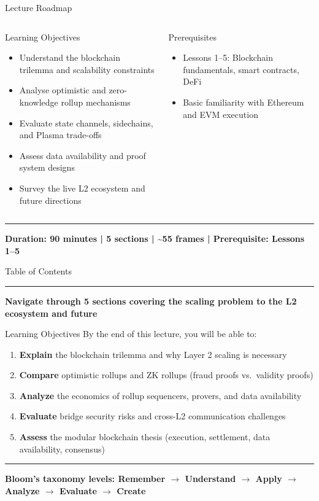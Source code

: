 \documentclass[8pt,aspectratio=169]{beamer}
\newcommand{\bottomnote}[1]{\vfill\vspace{-2mm}\textcolor{mllavender2}{\rule{\textwidth}{0.4pt}}\vspace{1mm}\footnotesize\textbf{#1}}
\begin{document}
\begin{frame}{Lecture Roadmap}
\begin{columns}[T]
\begin{block}{Learning Objectives}
\footnotesize
\begin{itemize}
  \item Understand the blockchain trilemma and scalability constraints
  \item Analyse optimistic and zero-knowledge rollup mechanisms
  \item Evaluate state channels, sidechains, and Plasma trade-offs
  \item Assess data availability and proof system designs
  \item Survey the live L2 ecosystem and future directions
\end{itemize}
\end{block}
\vspace{1mm}
\begin{block}{Prerequisites}
\footnotesize
\begin{itemize}
  \item Lessons 1--5: Blockchain fundamentals, smart contracts, DeFi
  \item Basic familiarity with Ethereum and EVM execution
\end{itemize}
\end{block}
\end{columns}
\bottomnote{Duration: 90 minutes | 5 sections | \textasciitilde55 frames | Prerequisite: Lessons 1--5}
\end{frame}

\begin{frame}{Table of Contents}
\tableofcontents
\bottomnote{Navigate through 5 sections covering the scaling problem to the L2 ecosystem and future}
\end{frame}

\begin{frame}{Learning Objectives}
By the end of this lecture, you will be able to:
\begin{enumerate}
\item \textbf{Explain} the blockchain trilemma and why Layer 2 scaling is necessary
\item \textbf{Compare} optimistic rollups and ZK rollups (fraud proofs vs.\ validity proofs)
\item \textbf{Analyze} the economics of rollup sequencers, provers, and data availability
\item \textbf{Evaluate} bridge security risks and cross-L2 communication challenges
\item \textbf{Assess} the modular blockchain thesis (execution, settlement, data availability, consensus)
\end{enumerate}
\bottomnote{Bloom's taxonomy levels: Remember $\rightarrow$ Understand $\rightarrow$ Apply $\rightarrow$ Analyze $\rightarrow$ Evaluate $\rightarrow$ Create}
\end{frame}
\end{document}
